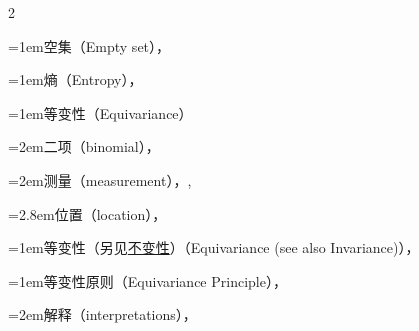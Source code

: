 \begin{multicols}{2}
\par\addvspace{2pt}
\par\noindent\hangindent=1em\hspace*{0em}\label{idx:397}空集（Empty set），\hyperref[idxocc:397:33]{\pageref*{idxocc:397:33}}\par
\par\addvspace{2pt}
\par\noindent\hangindent=1em\hspace*{0em}\label{idx:398}熵（Entropy），\hyperref[idxocc:398:196]{\pageref*{idxocc:398:196}}\par
\par\addvspace{2pt}
\par\noindent\hangindent=1em\hspace*{0em}\label{idx:399}等变性（Equivariance）\par
\par\noindent\hangindent=2em\hspace*{1em}\label{idx:400}二项（binomial），\hyperref[ex:6.4.1]{\pageref*{ex:6.4.1}}\par
\par\noindent\hangindent=2em\hspace*{1em}\label{idx:401}测量（measurement），\hyperref[idxocc:401:272]{\pageref*{idxocc:401:272}}, \hyperref[exercise:6.39]{\pageref*{exercise:6.39}}\par
\par\noindent\hangindent=2.8em\hspace*{1.8em}\label{idx:402}位置（location），\hyperref[exercise:6.41]{\pageref*{exercise:6.41}}\par
\par\addvspace{2pt}
\par\noindent\hangindent=1em\hspace*{0em}\label{idx:403}等变性（另见\hyperref[idx:587]{不变性}）（Equivariance (see also Invariance)），\hyperref[sec:6.4]{\pageref*{sec:6.4}}\par
\par\addvspace{2pt}
\par\noindent\hangindent=1em\hspace*{0em}\label{idx:404}等变性原则（Equivariance Principle），\hyperref[idxocc:404:272]{\pageref*{idxocc:404:272}}\par
\par\noindent\hangindent=2em\hspace*{1em}\label{idx:405}解释（interpretations），\hyperref[ex:6.4.6]{\pageref*{ex:6.4.6}}\par

\end{multicols}
